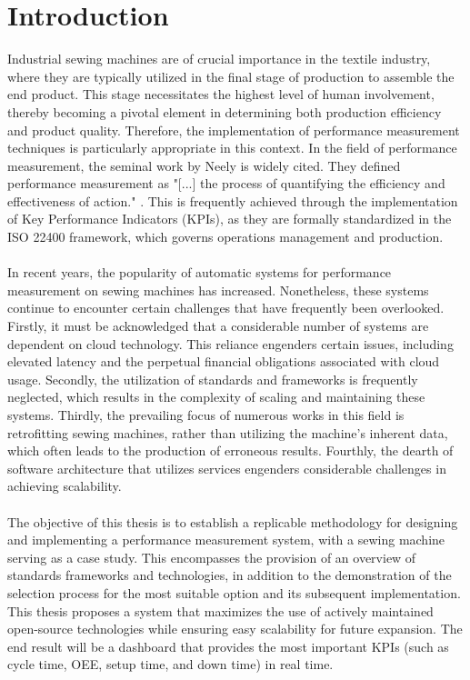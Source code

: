 \clearpage
\chapter{\textbf{Introduction}}\label{introduction}
Industrial sewing machines are of crucial importance in the textile industry, where they are typically utilized in the final stage of production to assemble the end product. This stage necessitates the highest level of human involvement, thereby becoming a pivotal element in determining both production efficiency and product quality. Therefore, the implementation of performance measurement techniques is particularly appropriate in this context. In the field of performance measurement, the seminal work by Neely \cite{neelyPerformanceMeasurementSystem1995} is widely cited. They defined performance measurement as "[...] the process of quantifying the efficiency and effectiveness of action." . This is frequently achieved through the implementation of Key Performance Indicators (KPIs), as they are formally standardized in the ISO 22400 framework, which governs operations management and production.
\\\\
In recent years, the popularity of automatic systems for performance measurement on sewing machines has increased. Nonetheless, these systems continue to encounter certain challenges that have frequently been overlooked. Firstly, it must be acknowledged that a considerable number of systems are dependent on cloud technology. This reliance engenders certain issues, including elevated latency and the perpetual financial obligations associated with cloud usage. Secondly, the utilization of standards and frameworks is frequently neglected, which results in the complexity of scaling and maintaining these systems. Thirdly, the prevailing focus of numerous works in this field is retrofitting sewing machines, rather than utilizing the machine's inherent data, which often leads to the production of erroneous results. Fourthly, the dearth of software architecture that utilizes services engenders considerable challenges in achieving scalability.
\\\\
The objective of this thesis is to establish a replicable methodology for designing and implementing a performance measurement system, with a sewing machine serving as a case study. This encompasses the provision of an overview of standards frameworks and technologies, in addition to the demonstration of the selection process for the most suitable option and its subsequent implementation. This thesis proposes a system that maximizes the use of actively maintained open-source technologies while ensuring easy scalability for future expansion. The end result will be a dashboard that provides the most important KPIs (such as cycle time, OEE, setup time, and down time) in real time.
